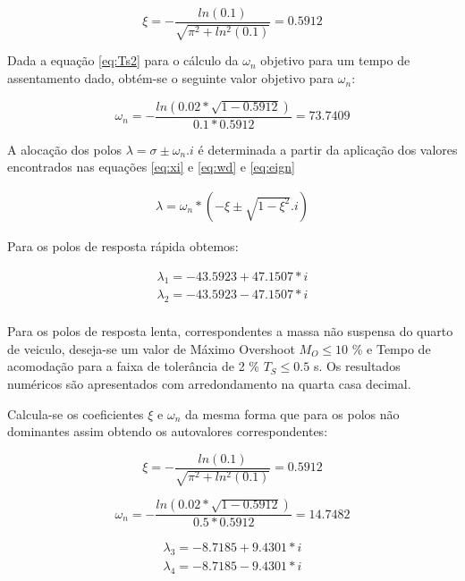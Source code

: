 \documentclass[a4paper]{ifacconf}
\begin{document}
\begin{equation*}
    \xi=-\frac{ln\left(0.1\right)}{\sqrt{\pi^2+ln^2(0.1)}}=0.5912
\end{equation*}

Dada a equação \ref{eq:Ts2} para o cálculo da $\omega_n$ objetivo para um tempo de assentamento dado, obtém-se o seguinte valor objetivo para $\omega_n$:

\begin{equation*}
    \omega_n=-\frac{ln\left( 0.02*\sqrt{1-0.5912} \right)}{0.1*0.5912}=73.7409
\end{equation*}

A alocação dos polos $\lambda = \sigma \pm \omega_n.i$ é determinada a partir da aplicação dos valores encontrados nas equações \ref{eq:xi} e \ref{eq:wd} e \ref{eq:eign}

\begin{align} \label{eq:polos_de_xi}
     \lambda = \omega_n * (-\xi \pm \sqrt{1-\xi^2}.i)
\end{align}

Para os polos de resposta rápida obtemos:

\begin{align*} \label{eq:polos_nao_dominantes}
     \lambda_1 = -43.5923 + 47.1507*i\\
     \lambda_2 = -43.5923 - 47.1507*i\\
\end{align*}

Para os polos de resposta lenta, correspondentes a massa não suspensa do quarto de veiculo, deseja-se um valor de Máximo Overshoot $M_O \leq 10$ \% e Tempo de acomodação para a faixa de tolerância de 2 \% $T_S \leq 0.5$ s. Os resultados numéricos são apresentados com arredondamento na quarta casa decimal.

Calcula-se os coeficientes $\xi$ e $\omega_n$ da mesma forma que para os polos não dominantes assim obtendo os autovalores correspondentes:

\begin{equation*}
    \xi=-\frac{ln\left(0.1\right)}{\sqrt{\pi^2+ln^2(0.1)}}=0.5912
\end{equation*}

\begin{equation*}
    \omega_n=-\frac{ln\left( 0.02*\sqrt{1-0.5912} \right)}{0.5*0.5912}=14.7482
\end{equation*}

\begin{align*} \label{eq:polos_dominantes}
     \lambda_3 = -8.7185 + 9.4301*i\\
     \lambda_4 = -8.7185 - 9.4301*i\\
\end{align*}
\end{document}
